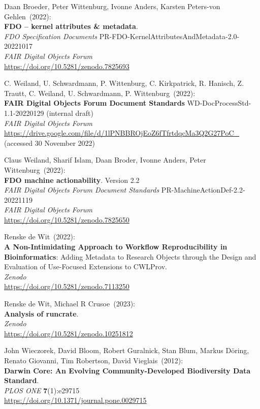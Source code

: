\begin{thebibliography}{9}
Daan Broeder, Peter Wittenburg, Ivonne Anders, Karsten Peters-von Gehlen~(2022): \\
\textbf{FDO -- kernel attributes \& metadata}.\\ 
\emph{FDO Specification Documents} PR-FDO-KernelAttributesAndMetadata-2.0-20221017 \\
\emph{FAIR Digital Objects Forum}\\
\url{https://doi.org/10.5281/zenodo.7825693}

C. Weiland, U. Schwardmann, P. Wittenburg, C. Kirkpatrick, R. Hanisch, Z. Trautt, C. Weiland, U. Schwardmann, P. Wittenburg~(2022): \\
\textbf{{FAIR Digital Objects Forum Document Standards}} WD-DocProcessStd-1.1-20220129 (internal draft) \\
\emph{FAIR Digital Objects Forum}\\
\url{https://drive.google.com/file/d/1lPNBBROjEoZ6fTfrtdqcMa3Q2G27PoC_}
(accessed 30 November 2022)

Claus Weiland, Sharif Islam, Daan Broder, Ivonne Anders, Peter Wittenburg~(2022): \\
\textbf{{FDO} machine actionability}. Version 2.2 \\
\emph{{FAIR Digital Objects Forum Document Standards}} PR-MachineActionDef-2.2-20221119 \\
\emph{FAIR Digital Objects Forum} \\
\url{https://doi.org/10.5281/zenodo.7825650}

Renske de Wit~(2022): \\
\textbf{A Non-Intimidating Approach to Workflow Reproducibility in Bioinformatics}: Adding Metadata to Research Objects through the Design and Evaluation of Use-Focused Extensions to CWLProv.\\
\emph{Zenodo}\\
\url{https://doi.org/10.5281/zenodo.7113250}

Renske de Wit, Michael R Crusoe~(2023): \\
\textbf{Analysis of runcrate}.\\
\emph{Zenodo}\\
\url{https://doi.org/10.5281/zenodo.10251812}

John Wieczorek, David Bloom, Robert Guralnick, Stan Blum, Markus Döring, Renato Giovanni, Tim Robertson, David Vieglais~(2012): \\
\textbf{Darwin {Core}: {An Evolving Community-Developed Biodiversity Data Standard}}.\\
\emph{PLOS ONE} \textbf{7}(1):e29715 \\
\url{https://doi.org/10.1371/journal.pone.0029715}


\end{thebibliography}
